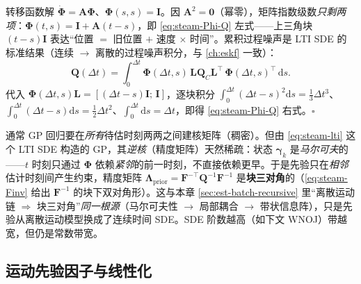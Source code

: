 \begin{derivation}
转移函数解 $\dot{\boldsymbol{\Phi}}=\mathbf{A}\boldsymbol{\Phi}$、$\boldsymbol{\Phi}(s,s)=\mathbf{I}$。因 $\mathbf{A}^2=\mathbf{0}$（幂零），矩阵指数级数\emph{只剩两项}：$\boldsymbol{\Phi}(t,s)=\mathbf{I}+\mathbf{A}(t-s)$，即 \cref{eq:steam-Phi-Q} 左式——上三角块 $(t-s)\mathbf{I}$ 表达“位置 $=$ 旧位置 $+$ 速度 $\times$ 时间”。累积过程噪声是 LTI SDE 的标准结果（连续 $\to$ 离散的过程噪声积分，与 \cref{ch:eskf} 一致）：
\[
  \mathbf{Q}(\Delta t)=\int_0^{\Delta t}\boldsymbol{\Phi}(\Delta t,s)\,\mathbf{L}\mathbf{Q}_C\mathbf{L}^\top\,\boldsymbol{\Phi}(\Delta t,s)^\top\,\mathrm{d}s .
\]
代入 $\boldsymbol{\Phi}(\Delta t,s)\mathbf{L}=[(\Delta t-s)\mathbf{I};\,\mathbf{I}]$，逐块积分 $\int_0^{\Delta t}(\Delta t-s)^2\mathrm{d}s=\tfrac13\Delta t^3$、$\int_0^{\Delta t}(\Delta t-s)\mathrm{d}s=\tfrac12\Delta t^2$、$\int_0^{\Delta t}\mathrm{d}s=\Delta t$，即得 \cref{eq:steam-Phi-Q} 右式。\hfill$\square$
\end{derivation}

\begin{insight}[GP 先验的稀疏性来自马尔可夫性]
通常 GP 回归要在\emph{所有}待估时刻两两之间建核矩阵（稠密）。但由 \cref{eq:steam-lti} 这个 LTI SDE 构造的 GP，其\emph{逆核}（精度矩阵）天然稀疏：状态 $\boldsymbol{\gamma}_k$ 是\emph{马尔可夫}的——$t$ 时刻只通过 $\boldsymbol{\Phi}$ 依赖\emph{紧邻}的前一时刻，不直接依赖更早。于是先验只在\emph{相邻}估计时刻间产生约束，精度矩阵 $\boldsymbol{\Lambda}_{\text{prior}}=\mathbf{F}^{-\top}\mathbf{Q}^{-1}\mathbf{F}^{-1}$ 是\textbf{块三对角}的（\cref{eq:steam-Finv} 给出 $\mathbf{F}^{-1}$ 的块下双对角形）。这与本章 \cref{sec:est-batch-recursive} 里“离散运动链 $\Rightarrow$ 块三对角”\emph{同一根源}（马尔可夫性 $\to$ 局部耦合 $\to$ 带状信息阵），只是先验从离散运动模型换成了连续时间 SDE。SDE 阶数越高（如下文 WNOJ）带越宽，但仍是常数带宽。
\end{insight}

\subsection{运动先验因子与线性化}
\label{sec:est-steam-factor}

